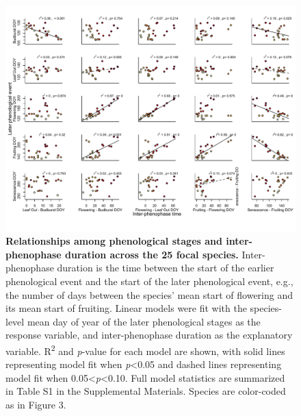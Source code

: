 \documentclass{article}
\begin{document}
\begin{figure}[h]
  \centering
  \includegraphics{../analyses/figures/adj_stagesmegaplot_col_YOR.pdf}
  \caption{\textbf{Relationships among phenological stages and inter-phenophase duration across the 25 focal species.} Inter-phenophase duration is the time between the start of the earlier phenological event and the start of the later phenological event, e.g., the number of days between the species' mean start of flowering and its mean start of fruiting. Linear models were fit with the species-level mean day of year of the later phenological stages as the response variable, and inter-phenophase duration as the explanatory variable. R\textsuperscript{2} and \textit{p}-value for each model are shown, with solid lines representing model fit when \textit{p}<0.05 and dashed lines representing model fit when 0.05<\textit{p}<0.10. Full model statistics are summarized in Table S1 in the Supplemental Materials. Species are color-coded as in Figure 3.}
  \label{fig:inter}
   \end{figure}


\end{document}
